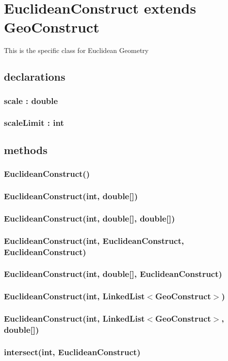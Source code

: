 \documentclass[a4paper,10pt]{report}
\begin{document}
\section{EuclideanConstruct extends GeoConstruct} This is the specific class for Euclidean Geometry
\subsection{declarations}
\subsubsection{scale : double}
\subsubsection{scaleLimit : int}
\subsection{methods}
\subsubsection{EuclideanConstruct()}
\subsubsection{EuclideanConstruct(int, double[])}
\subsubsection{EuclideanConstruct(int, double[], double[])}
\subsubsection{EuclideanConstruct(int, EuclideanConstruct, EuclideanConstruct)}
\subsubsection{EuclideanConstruct(int, double[], EuclideanConstruct)}
\subsubsection{EuclideanConstruct(int, LinkedList$<$GeoConstruct$>$)}
\subsubsection{EuclideanConstruct(int, LinkedList$<$GeoConstruct$>$, double[])}
\subsubsection{intersect(int, EuclideanConstruct)}
\end{document}
